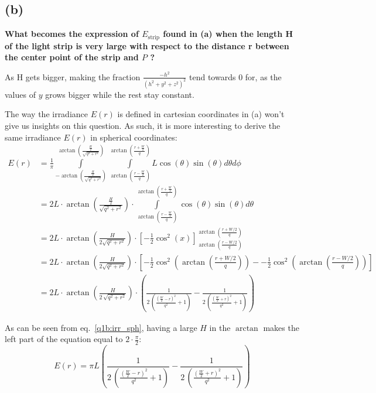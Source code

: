 \documentclass{report}
\begin{document}
\subsection{(b)}
\textbf{ What becomes the expression of $E_{\text{strip}}$ found in (a) when the length H of the light strip is very large with respect to the distance r between the center point of the strip and $P$ ?}

As H gets bigger, making the fraction $\frac{-h^2}{\left(h^2 + y^2 + z^2\right)^2}$ tend towards $0$ for, as the values of $y$ grows bigger while the rest stay constant.

The way the irradiance $E(r)$ is defined in cartesian coordinates in (a) won't give us insights on this question. As such, it is more interesting to derive the same irradiance $E(r)$ in spherical coordinates:
\begin{align}
E(r) &= \frac{1}{\pi} \int\limits_{-\arctan(\frac{\frac{H}{2}}{\sqrt{q^2+r^2}})}^{\arctan(\frac{\frac{H}{2}}{\sqrt{q^2+r^2}})} \int\limits_{\arctan \left(\frac{r-\frac{W}{2}}{q} \right)}^{\arctan \left(\frac{r+\frac{W}{2}}{q} \right)} L \cos(\theta) \sin(\theta) d\theta d\phi \\
     &= 2 L \cdot \arctan \left(\frac{\frac{H}{2}}{\sqrt{q^2+r^2}}\right) \cdot \int\limits_{\arctan \left(\frac{r-\frac{W}{2}}{q} \right)}^{\arctan \left(\frac{r+\frac{W}{2}}{q} \right)} \cos(\theta) \sin(\theta) d\theta \\
     &= 2 L \cdot \arctan \left(\frac{H}{2\sqrt{q^2+r^2}} \right) \cdot \left[ - \frac{1}{2} \cos^2(x) \right]_{\arctan(\frac{r-W/2}{q})}^{\arctan \left(\frac{r+W/2}{q} \right)} \\
     &= 2 L \cdot \arctan \left(\frac{H}{2\sqrt{q^2+r^2}} \right) \cdot \left[ - \frac{1}{2} \cos^2\left(\arctan\left(\frac{r+W/2}{q}\right)\right) - - \frac{1}{2} \cos^2\left(\arctan\left(\frac{r-W/2}{q}\right)\right) \right] \\
     &= 2 L \cdot \arctan\!\left(\frac{H}{2\, \sqrt{q^2 + r^2}}\right) \cdot \left(\frac{1}{2\, \left(\frac{{\left(\frac{W}{2} - r\right)}^2}{q^2} + 1\right)} - \frac{1}{2\, \left(\frac{{\left(\frac{W}{2} + r\right)}^2}{q^2} + 1\right)}\right)
     \label{q1b:irr_sph}
\end{align}

As can be seen from eq.~\eqref{q1b:irr_sph}, having a large $H$ in the $\arctan$ makes the left part of the equation equal to $2 \cdot \frac{\pi}{2}$:
\begin{equation}
E(r) = \pi L \left(\frac{1}{2\, \left(\frac{{\left(\frac{W}{2} - r\right)}^2}{q^2} + 1\right)} - \frac{1}{2\, \left(\frac{{\left(\frac{W}{2} + r\right)}^2}{q^2} + 1\right)}\right)
\end{equation}
\end{document}
